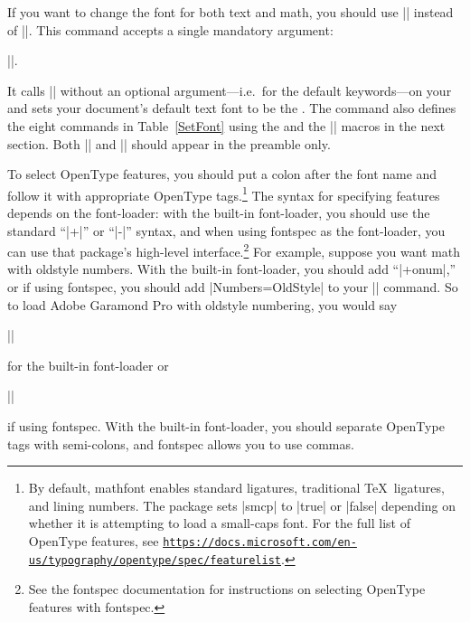 \documentclass[12pt,twoside]{article}
\def\link#1{\href{#1}{\nolinkurl{#1}}}
\begin{document}
If you want to change the font for both text and math, you should use |\setfont| instead of |\mathfont|. This command accepts a single mandatory argument:
\begin{code}
||.
\end{code}
It calls |\mathfont| without an optional argument---i.e.\ for the default keywords---on your  and sets your document's default text font to be the . The command also defines the eight commands in Table~\ref{SetFont} using the  and the |\new| macros in the next section. Both |\mathfont| and |\setfont| should appear in the preamble only.

To select OpenType features, you should put a colon after the font name and follow it with appropriate OpenType tags.\footnote{By default, \textsf{mathfont} enables standard ligatures, traditional \TeX\ ligatures, and lining numbers. The package sets |smcp| to |true| or |false| depending on whether it is attempting to load a small-caps font. For the full list of OpenType features, see \link{https://docs.microsoft.com/en-us/typography/opentype/spec/featurelist}.} The syntax for specifying features depends on the font-loader: with the built-in font-loader, you should use the standard ``|+|'' or ``|-|'' syntax, and when using \textsf{fontspec} as the font-loader, you can use that package's high-level interface.\footnote{See the \textsf{fontspec} documentation for instructions on selecting OpenType features with \textsf{fontspec}.} For example, suppose you want math with oldstyle numbers. With the built-in font-loader, you should add ``|+onum|,'' or if using \textsf{fontspec}, you should add |Numbers=OldStyle| to your |\mathfont| command. So to load Adobe Garamond Pro with oldstyle numbering, you would say
\begin{code}
||
\end{code}
for the built-in font-loader or
\begin{code}
||
\end{code}
if using \textsf{fontspec}. With the built-in font-loader, you should separate OpenType tags with semi-colons, and \textsf{fontspec} allows you to use commas.
\end{document}
